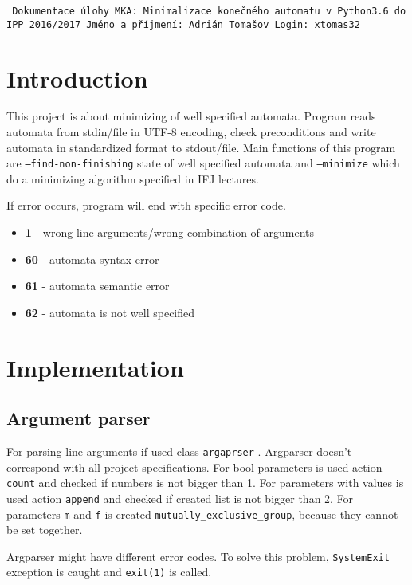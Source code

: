 \documentclass[a4paper, 10pt]{article}
\begin{document}
\begin{flushleft}
{\tt
	\noindent Dokumentace úlohy MKA: Minimalizace konečného automatu v Python3.6 do IPP 2016/2017 \linebreak
	Jméno a příjmení: Adrián Tomašov \linebreak
	Login: xtomas32 \linebreak
}
\end{flushleft}

\section{Introduction}

This project is about minimizing of well specified automata. Program reads automata from stdin/file in UTF-8 encoding, check preconditions and write automata in standardized format to stdout/file. Main functions of this program are {\tt --find-non-finishing} state of well specified automata and {\tt --minimize} which do a minimizing algorithm specified in IFJ lectures.

If error occurs, program will end with specific error code.
\begin{itemize}
	\item \textbf{1} - wrong line arguments/wrong combination of arguments
	\item \textbf{60} - automata syntax error
	\item \textbf{61} - automata semantic error
	\item \textbf{62} - automata is not well specified
\end{itemize} 

\section{Implementation}

\subsection{Argument parser}
For parsing line arguments if used class {\tt argaprser} . Argparser doesn't correspond with all project specifications. For bool parameters is used action {\tt count} and checked if numbers is not bigger than 1. For parameters with values is used action {\tt append} and checked if created list is not bigger than 2. For parameters {\tt \-m} and {\tt \-f} is created {\tt mutually\_exclusive\_group}, because they cannot be set together.

Argparser might have different error codes. To solve this problem, {\tt SystemExit} exception is caught and {\tt exit(1)} is called.
\end{document}
